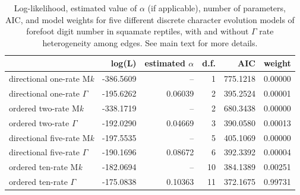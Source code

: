 \documentclass[fleqn,10pt,lineno]{wlpeerj} %
\begin{document}
\begin{table}

\caption{\label{tab:unnamed-chunk-10}Log-likelihood, estimated value of $\alpha$ (if applicable), number of parameters, AIC, and model weights for five different discrete character evolution models of forefoot digit number in squamate reptiles, with and without $\Gamma$ rate heterogeneity among edges. See main text for more details.}
\centering
\begin{tabular}[t]{l|r|r|r|r|r}
\hline
  & log(L) & estimated $\alpha$ & d.f. & AIC & weight\\
\hline
directional one-rate M\emph{k} & -386.5609 & -- & 1 & 775.1218 & 0.00000\\
\hline
directional one-rate $\Gamma$ & -195.6262 & 0.06039 & 2 & 395.2524 & 0.00001\\
\hline
ordered two-rate M\emph{k} & -338.1719 & -- & 2 & 680.3438 & 0.00000\\
\hline
ordered two-rate $\Gamma$ & -192.0290 & 0.04669 & 3 & 390.0580 & 0.00013\\
\hline
directional five-rate M\emph{k} & -197.5535 & -- & 5 & 405.1069 & 0.00000\\
\hline
directional five-rate $\Gamma$ & -190.1696 & 0.08672 & 6 & 392.3392 & 0.00004\\
\hline
ordered ten-rate M\emph{k} & -182.0694 & -- & 10 & 384.1389 & 0.00251\\
\hline
ordered ten-rate $\Gamma$ & -175.0838 & 0.10363 & 11 & 372.1675 & 0.99731\\
\hline
\end{tabular}
\end{table}
\end{document}
